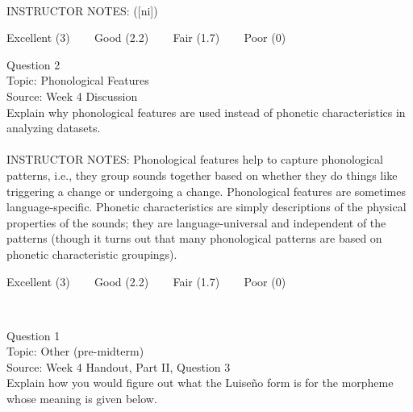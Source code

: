 \documentclass[12pt]{article}
\begin{document}
~\\
INSTRUCTOR NOTES: ([ni])


\vfill
Excellent (3) ~~~ Good (2.2) ~~~ Fair (1.7) ~~~ Poor (0)
\newpage

{\large Question 2}\\

Topic: Phonological Features\\
Source: Week 4 Discussion\\

Explain why phonological features are used instead of phonetic characteristics in analyzing datasets.\\


~\\
INSTRUCTOR NOTES: Phonological features help to capture phonological patterns, i.e., they group sounds together based on whether they do things like triggering a change or undergoing a change. Phonological features are sometimes language-specific. Phonetic characteristics are simply descriptions of the physical properties of the sounds; they are language-universal and independent of the patterns (though it turns out that many phonological patterns are based on phonetic characteristic groupings).


\vfill
Excellent (3) ~~~ Good (2.2) ~~~ Fair (1.7) ~~~ Poor (0)
\newpage

\begin{center}
\textbf{{\color{red}{\HUGE END OF EXAM}}}\\

\end{center}
\newpage

\begin{center}
\textbf{{\color{blue}{\HUGE START OF EXAM\\}}}

\textbf{{\color{blue}{\HUGE Student ID: 16758\\}}}

\textbf{{\color{blue}{\HUGE 9:40\\}}}

\end{center}
\newpage

{\large Question 1}\\

Topic: Other (pre-midterm)\\
Source: Week 4 Handout, Part II, Question 3\\

Explain how you would figure out what the Luiseño form is for the morpheme whose meaning is given below.\\
\end{document}
